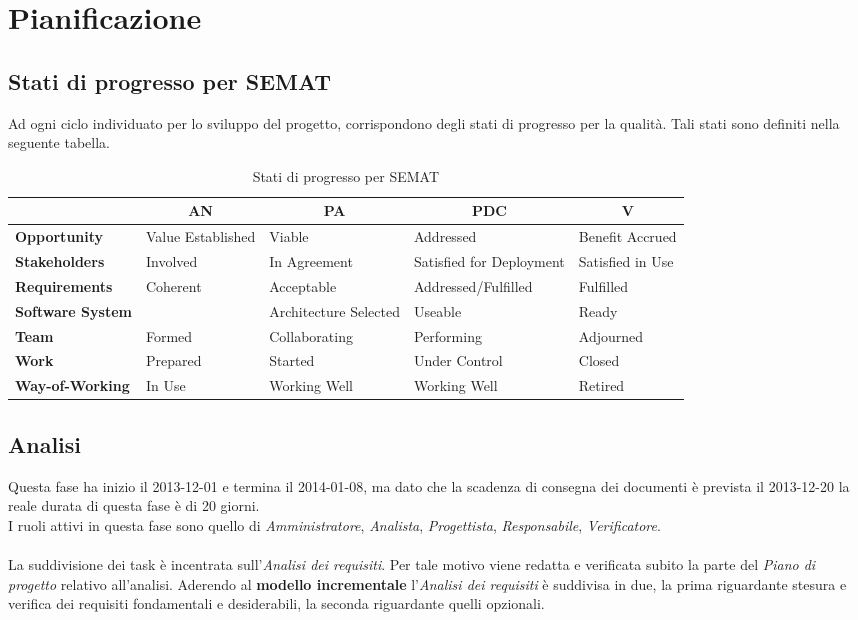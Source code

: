 \section{Pianificazione}


	\subsection{Stati di progresso per SEMAT}

Ad ogni ciclo individuato per lo sviluppo del progetto, corrispondono degli stati di progresso per la qualità. Tali stati sono definiti nella seguente tabella.

\begin{table}[H]
	\begin{adjustwidth}{-4cm}{-4cm}
	\centering
	\begin{tabular}{ l l l l l }
	\hline
	&
	\multicolumn{1}{c}{\textbf{AN}} & 
	\multicolumn{1}{c}{\textbf{PA}} & 
	\multicolumn{1}{c}{\textbf{PDC}} & 
	\multicolumn{1}{c}{\textbf{V}} \\
	\hline

	\textbf{Opportunity} & Value Established & Viable & Addressed & Benefit Accrued \\
	\textbf{Stakeholders} & Involved & In Agreement & Satisfied for Deployment & Satisfied in Use \\
	\textbf{Requirements} & Coherent & Acceptable & Addressed/Fulfilled & Fulfilled \\
	\textbf{Software System} & & Architecture Selected & Useable & Ready \\
	\textbf{Team} & Formed & Collaborating & Performing & Adjourned \\
	\textbf{Work} & Prepared & Started & Under Control & Closed \\
	\textbf{Way-of-Working} & In Use & Working Well & Working Well & Retired \\

	\hline
	\end{tabular}
	\caption{Stati di progresso per SEMAT}
	\end{adjustwidth}
\end{table}

	\subsection{Analisi}

Questa fase ha inizio il 2013-12-01 e termina il 2014-01-08, ma dato che la scadenza di consegna dei documenti è prevista il 2013-12-20 la reale durata di questa fase è di 20 giorni. \\
I ruoli attivi in questa fase sono quello di \textit{Amministratore}, \textit{Analista}, \textit{Progettista}, \textit{Responsabile}, \textit{Verificatore}. \\ \\
La suddivisione dei task è incentrata sull'\textit{Analisi dei requisiti}. Per tale motivo viene redatta e verificata subito la parte del \textit{Piano di progetto} relativo all'analisi.
Aderendo al \textbf{modello incrementale} l'\textit{Analisi dei requisiti} è suddivisa in due, la prima riguardante stesura e verifica dei requisiti fondamentali e desiderabili, la seconda riguardante quelli opzionali.
